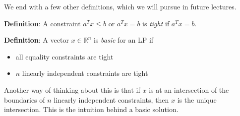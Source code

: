 \documentclass{article}
\newcommand{\reals}{\mathbb{R}}
\begin{document}
We end with a few other definitions, which we will pursue in future
lectures.

\textbf{Definition}:
  A constraint $a^T x \leq b$ or $a^T x = b$ is \emph{tight} if $a^T x
  = b$.

\textbf{Definition}:
  A vector $x \in \reals^n$ is \emph{basic} for an LP if
  \begin{itemize}
  \item all equality constraints are tight
  \item $n$ linearly independent constraints are tight
  \end{itemize}

Another way of thinking about this is that if $x$ is at an
intersection of the boundaries of $n$ linearly independent
constraints, then $x$ is the unique intersection.  This is the
intuition behind a basic solution.
\end{document}
